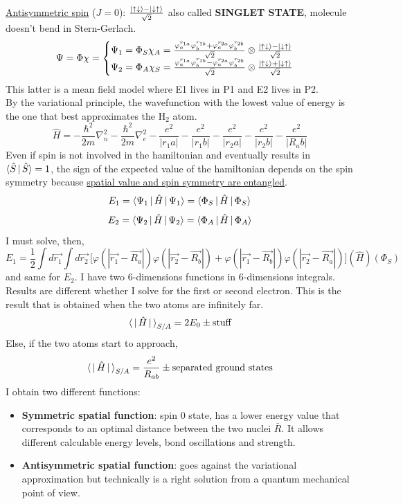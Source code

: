 \newline
\underline{Antisymmetric spin} ($J=0$): $\frac{\ket{\uparrow\downarrow}-\ket{\downarrow\uparrow}}{\sqrt{2}}$ also called \textbf{SINGLET STATE}, molecule doesn't bend in Stern-Gerlach.\\
\[
\Psi=\Phi\chi=\begin{cases}
\Psi_1=\Phi_S\chi_A=\frac{\varphi_a^{r_{1a}}\varphi_b^{r_{1b}}+\varphi_a^{r_{2a}}\varphi_b^{r_{2b}}}{\sqrt{2}}\otimes\frac{\ket{\uparrow\downarrow}-\ket{\downarrow\uparrow}}{\sqrt{2}}\\
\Psi_2=\Phi_A\chi_S=\frac{\varphi_a^{r_{1a}}\varphi_b^{r_{1b}}-\varphi_a^{r_{2a}}\varphi_b^{r_{2b}}}{\sqrt{2}}\otimes\frac{\ket{\uparrow\downarrow}+\ket{\downarrow\uparrow}}{\sqrt{2}}\\
\end{cases}
\]
This latter is a mean field model where E1 lives in P1 and E2 lives in P2.\\
By the variational principle, the wavefunction with the lowest value of energy is the one that best approximates the H$_2$ atom.\\
\[
\hat{H}=-\frac{\hbar^2}{2m}\nabla_n^2-\frac{\hbar^2}{2m}\nabla_e^2-\frac{e^2}{|r_1a|}-\frac{e^2}{|r_1b|}-\frac{e^2}{|r_2a|}-\frac{e^2}{|r_2b|}-\frac{e^2}{|R_ab|}
\]
Even if spin is not involved in the hamiltonian and eventually results in $\braket{\hat{S}\,|\,\hat{S}}=1$, the sign of the expected value of the hamiltonian depends on the spin symmetry because \underline{spatial value and spin symmetry are entangled}.
\[E_1=\braket{\Psi_1\,|\,\hat{H}\,|\,\Psi_1}=\braket{\Phi_S\,|\,\hat{H}\,|\,\Phi_S}\]
\[E_2=\braket{\Psi_2\,|\,\hat{H}\,|\,\Psi_2}=\braket{\Phi_A\,|\,\hat{H}\,|\,\Phi_A}\]
I must solve, then,
\[
E_1=\frac{1}{2}\int d\vec{r_1}\int d\vec{r_2}\,\big[\varphi(|\vec{r_1}-\vec{R_a}|)\varphi(|\vec{r_2}-\vec{R_b}|)+\varphi(|\vec{r_1}-\vec{R_b}|)\varphi(|\vec{r_2}-\vec{R_a}|)\big](\hat{H})(\Phi_S)
\]
and same for $E_2$. I have two 6-dimensions functions in 6-dimensions integrals.\\
Results are different whether I solve for the first or second electron. This is the result that is obtained when the two atoms are infinitely far.\\
\[
\braket{\,|\,\hat{H}\,|\,}_{S/A}=2E_0\pm\text{stuff}
\]
Else, if the two atoms start to approach,
\[
\braket{\,|\,\hat{H}\,|\,}_{S/A}=\frac{e^2}{R_{ab}}\pm\text{separated ground states}
\]
I obtain two different functions:
\begin{itemize}
	\item \textbf{Symmetric spatial function}: spin 0 state, has a lower energy value that corresponds to an optimal distance between the two nuclei $\bar{R}$. It allows different calculable energy levels, bond oscillations and strength.
	\item \textbf{Antisymmetric spatial function}: goes against the variational approximation but technically is a right solution from a quantum mechanical point of view.
\end{itemize}
